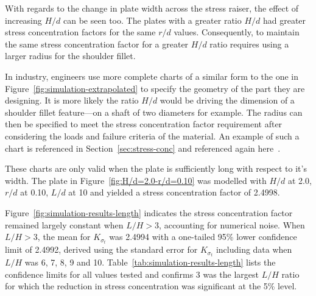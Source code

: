 \documentclass[a4paper,11pt,twocolumn]{article}
\begin{document}
With regards to the change in plate width across the stress raiser, the effect
of increasing $H/d$ can be seen too. The plates with a greater ratio $H/d$ had
greater stress concentration factors for the same $r/d$ values. Consequently,
to maintain the same stress concentration factor for a greater $H/d$
ratio requires using a larger radius for the shoulder fillet.

In industry, engineers use more complete charts of a similar form to the one in
Figure~\ref{fig:simulation-extrapolated} to specify the geometry of the part
they are designing. It is more likely the ratio $H/d$ would be driving the
dimension of a shoulder fillet feature---on a shaft of two diameters for
example. The radius can then be specified to meet the stress concentration
factor requirement after considering the loads and failure criteria of the
material. An example of such a chart is referenced in
Section~\ref{sec:stress-conc} and referenced again 
\mbox{here~\cite[p.~151]{pilkey2008peterson}}.

These charts are only valid when the plate is sufficiently long with respect to
it's width. The plate in Figure~\vref{fig:H/d=2.0-r/d=0.10} was modelled with
$H/d$ at 2.0, $r/d$ at 0.10, $L/d$ at 10 and yielded a stress concentration
factor of 2.4998.

Figure~\ref{fig:simulation-results-length} indicates the stress concentration
factor remained largely constant when \mbox{$L/H > 3$}, accounting for numerical
noise. When \mbox{$L/H > 3$}, the mean for $K_{\sigma_t}$ was 2.4994 with a
one-tailed 95\% lower confidence limit of 2.4992, derived using the standard
error for $K_{\sigma_t}$ including data when $L/H$ was 6, 7, 8, 9 and 10.
Table~\vref{tab:simulation-results-length} lists the confidence limits for all
values tested and confirms 3 was the largest $L/H$ ratio for which the
reduction in stress concentration was significant at the 5\% level.
\end{document}
